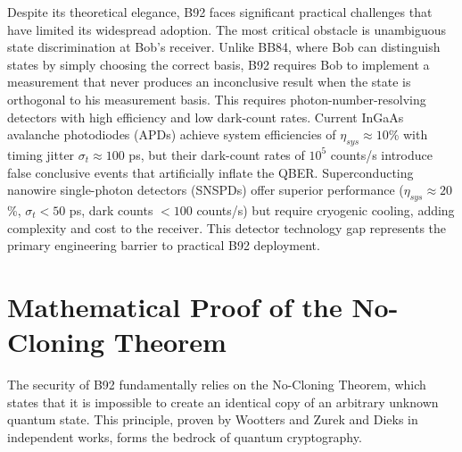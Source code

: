 \documentclass[conference]{IEEEtran}
\begin{document}
Despite its theoretical elegance, B92 faces significant practical challenges that have limited its widespread adoption. The most critical obstacle is unambiguous state discrimination at Bob's receiver. Unlike BB84, where Bob can distinguish states by simply choosing the correct basis, B92 requires Bob to implement a measurement that never produces an inconclusive result when the state is orthogonal to his measurement basis. This requires photon-number-resolving detectors with high efficiency and low dark-count rates. Current InGaAs avalanche photodiodes (APDs) achieve system efficiencies of $\eta_{sys} \approx 10$\% with timing jitter $\sigma_t \approx 100$ ps, but their dark-count rates of $10^5$ counts/s introduce false conclusive events that artificially inflate the QBER. Superconducting nanowire single-photon detectors (SNSPDs) offer superior performance ($\eta_{sys} \approx 20$\%, $\sigma_t < 50$ ps, dark counts $< 100$ counts/s) but require cryogenic cooling, adding complexity and cost to the receiver. This detector technology gap represents the primary engineering barrier to practical B92 deployment.

\section{Mathematical Proof of the No-Cloning Theorem}\label{sec:nocloning}
The security of B92 fundamentally relies on the No-Cloning Theorem, which states that it is impossible to create an identical copy of an arbitrary unknown quantum state. This principle, proven by Wootters and Zurek \cite{wootters1982single} and Dieks \cite{dieks1982communication} in independent works, forms the bedrock of quantum cryptography.
\end{document}
